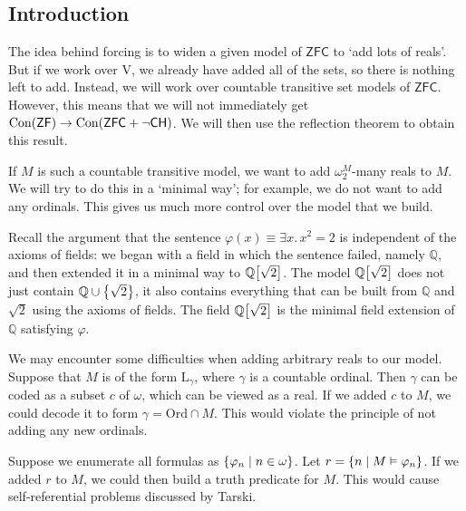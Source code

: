 \subsection{Introduction}
The idea behind forcing is to widen a given model of \( \mathsf{ZFC} \) to `add lots of reals'.
But if we work over \( \mathrm{V} \), we already have added all of the sets, so there is nothing left to add.
Instead, we will work over countable transitive set models of \( \mathsf{ZFC} \).
However, this means that we will not immediately get \( \operatorname{Con}(\mathsf{ZF}) \to \operatorname{Con}(\mathsf{ZFC} + \neg\mathsf{CH}) \).
We will then use the reflection theorem to obtain this result.

If \( M \) is such a countable transitive model, we want to add \( \omega_2^M \)-many reals to \( M \).
We will try to do this in a `minimal way'; for example, we do not want to add any ordinals.
This gives us much more control over the model that we build.

Recall the argument that the sentence \( \varphi(x) \equiv \exists x.\, x^2 = 2 \) is independent of the axioms of fields: we began with a field in which the sentence failed, namely \( \mathbb Q \), and then extended it in a minimal way to \( \mathbb Q\qty[\sqrt{2}] \).
The model \( \mathbb Q\qty[\sqrt{2}] \) does not just contain \( \mathbb Q \cup \qty{\sqrt{2}} \), it also contains everything that can be built from \( \mathbb Q \) and \( \sqrt{2} \) using the axioms of fields.
The field \( \mathbb Q\qty[\sqrt{2}] \) is the minimal field extension of \( \mathbb Q \) satisfying \( \varphi \).

We may encounter some difficulties when adding arbitrary reals to our model.
Suppose that \( M \) is of the form \( \mathrm{L}_\gamma \), where \( \gamma \) is a countable ordinal.
Then \( \gamma \) can be coded as a subset \( c \) of \( \omega \), which can be viewed as a real.
If we added \( c \) to \( M \), we could decode it to form \( \gamma = \mathrm{Ord} \cap M \).
This would violate the principle of not adding any new ordinals.

Suppose we enumerate all formulas as \( \qty{\varphi_n \mid n \in \omega} \).
Let \( r = \qty{n \mid M \vDash \varphi_n} \).
If we added \( r \) to \( M \), we could then build a truth predicate for \( M \).
This would cause self-referential problems discussed by Tarski.

